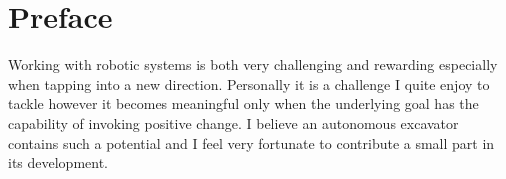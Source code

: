\chapter{Preface}

Working with robotic systems is both very challenging and rewarding especially when tapping into a new direction. Personally it is a challenge I quite enjoy to tackle however it becomes meaningful only when the underlying goal has the capability of invoking positive change. I believe an autonomous excavator contains such a potential and I feel very fortunate to contribute a small part in its development.



